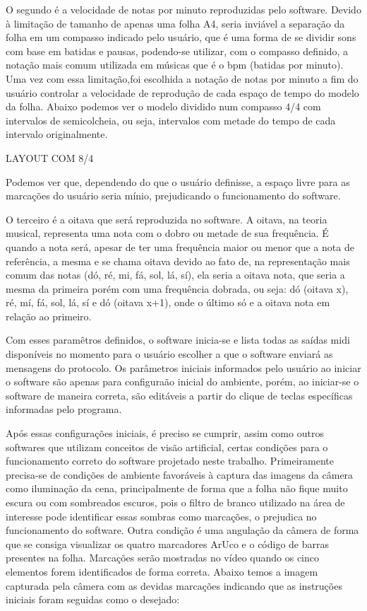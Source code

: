 \documentclass[12pt]{report}
\begin{document}
O segundo é a velocidade de notas por minuto reproduzidas pelo software. Devido à limitação de tamanho de apenas uma folha A4, seria inviável a separação da folha em um compasso indicado pelo usuário, que é uma forma de se dividir sons com base em batidas e pausas, podendo-se utilizar, com o compasso definido, a notação mais comum utilizada em músicas que é o bpm (batidas por minuto). Uma vez com essa limitação,foi escolhida a notação de notas por minuto a fim do usuário controlar a velocidade de reprodução de cada espaço de tempo do modelo da folha. Abaixo podemos ver o modelo dividido num compasso 4/4 com intervalos de semicolcheia, ou seja, intervalos com metade do tempo de cada intervalo originalmente.

LAYOUT COM 8/4

Podemos ver que, dependendo do que o usuário definisse, a espaço livre para as marcações do usuário seria mínio, prejudicando o funcionamento do software.

O terceiro é a oitava que será reproduzida no software. A oitava, na teoria musical, representa uma nota com o dobro ou metade de sua frequência. É quando a nota será, apesar de ter uma frequência maior ou menor que a nota de referência, a mesma e se chama oitava devido ao fato de, na representação mais comum das notas (dó, ré, mi, fá, sol, lá, sí), ela seria a oitava nota, que seria a mesma da primeira porém com uma frequência dobrada, ou seja: dó (oitava x), ré, mí, fá, sol, lá, sí e dó (oitava x+1), onde o último só e a oitava nota em relação ao primeiro.

Com esses paramêtros definidos, o software inicia-se e lista todas as saídas midi disponíveis no momento para o usuário escolher a que o software enviará as mensagens do protocolo. Os parâmetros iniciais informados pelo usuário ao iniciar o software são apenas para configuraão inicial do ambiente, porém, ao iniciar-se o software de maneira correta, são editáveis a partir do clique de teclas específicas informadas pelo programa.

Após essas configurações iniciais, é preciso se cumprir, assim como outros softwares que utilizam conceitos de visão artificial, certas condições para o funcionamento correto do software projetado neste trabalho.
Primeiramente precisa-se de condições de ambiente favoráveis à captura das imagens da câmera como iluminação da cena, principalmente de forma que a folha não fique muito escura ou com sombreados escuros, pois o filtro de branco utilizado na área de interesse pode identificar essas sombras como marcações, o prejudica no funcionamento do software. Outra condição é uma angulação da câmera de forma que se consiga visualizar os quatro marcadores ArUco e o código de barras presentes na folha. Marcações serão mostradas no vídeo quando os cinco elementos forem identificados de forma correta. Abaixo temos a imagem capturada pela câmera com as devidas marcações indicando que as instruções iniciais foram seguidas como o desejado:
\end{document}
